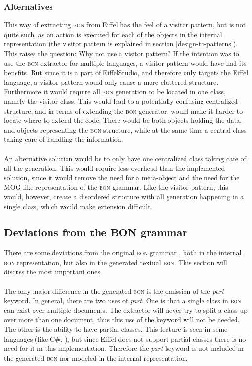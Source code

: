 \subsubsection{Alternatives}
This way of extracting \textsc{bon} from Eiffel has the feel of a visitor pattern, but is not quite such, as an action is executed for each of the objects in the internal representation (the visitor pattern is explained in section \ref{design-tc-patterns}). This raises the question: Why not use a visitor pattern? If the intention was to use the \textsc{bon} extractor for multiple languages, a visitor pattern would have had its benefits. But since it is a part of EiffelStudio, and therefore only targets the Eiffel language, a visitor pattern would only cause a more cluttered structure. Furthermore it would require all \textsc{bon} generation to be located in one class, namely the visitor class. This would lead to a potentially confusing centralized structure, and in terms of extending the \textsc{bon} generator, would make it harder to locate where to extend the code. There would be both objects holding the data, and objects representing the \textsc{bon} structure, while at the same time a central class taking care of handling the information.
\paragraph{}
An alternative solution would be to only have one centralized class taking care of all the generation. This would require less overhead than the implemented solution, since it would remove the need for a meta-object and the need for the MOG-like representation of the \textsc{bon} grammar. Like the visitor pattern, this would, however, create a disordered structure with all generation happening in a single class, which would make extension difficult.

\subsection{Deviations from the BON grammar}
\label{deviations_from_bon}There are some deviations from the original \textsc{bon} grammar \cite[pp.~352-359]{walden1995}, both in the internal \textsc{bon} representation, but also in the generated textual \textsc{bon}. This section will discuss the most important ones. 

\paragraph{}
\label{part}
The only major difference in the generated \textsc{bon} is the omission of the \textit{part} keyword. In general, there are two uses of \textit{part}. One is that a single class in \textsc{bon} can exist over multiple documents. The extractor will never try to split a class up over more than one document, thus this use of the keyword will not be needed. The other is the ability to have partial classes. This feature is seen in some languages (like C\#, \cite{msdn2009}), but since Eiffel does not support partial classes there is no need for it in this implementation. Therefore the \textit{part} keyword is not included in the generated \textsc{bon} nor modeled in the internal representation.

